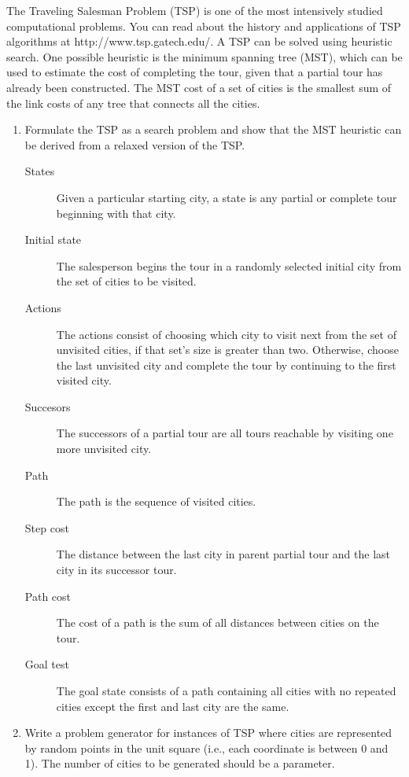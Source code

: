 \documentclass[12pt]{article}
\newenvironment{problem}[2][Problem]{\begin{trivlist}
\item[\hskip \labelsep {\bfseries #1}\hskip \labelsep {\bfseries #2.}]}{\end{trivlist}}
\begin{document}
\begin{problem}{6}
	The Traveling Salesman Problem (TSP) is one of the most intensively studied computational problems.
	You can read about the history and applications of TSP algorithms at http://www.tsp.gatech.edu/.
	A TSP can be solved using heuristic search.
	One possible heuristic is the minimum spanning tree (MST), which can be used to estimate the cost of completing the tour, given that a partial tour has already been constructed.
	The MST cost of a set of cities is the smallest sum of the link costs of any tree that connects all the cities.
	\begin{enumerate}
		\item Formulate the TSP as a search problem and show that the MST heuristic can be derived from a relaxed version of the TSP.
			\begin{description}
				\item[States] Given a particular starting city, a state is any partial or complete tour beginning with that city.
				\item[Initial state] The salesperson begins the tour in a randomly selected initial city from the set of cities to be visited.
				\item[Actions] The actions consist of choosing which city to visit next from the set of unvisited cities, if that set's size is greater than two.
					Otherwise, choose the last unvisited city and complete the tour by continuing to the first visited city.
				\item[Succesors] The successors of a partial tour are all tours reachable by visiting one more unvisited city.
				\item[Path] The path is the sequence of visited cities.
				\item[Step cost] The distance between the last city in parent partial tour and the last city in its successor tour.
				\item[Path cost] The cost of a path is the sum of all distances between cities on the tour.
				\item[Goal test] The goal state consists of a path containing all cities with no repeated cities except the first and last city are the same.
			\end{description}
		\item Write a problem generator for instances of TSP where cities are represented by random points in the unit square (i.e., each coordinate is between 0 and 1).
			The number of cities to be generated should be a parameter.


\end{enumerate}
\end{problem}
\end{document}
